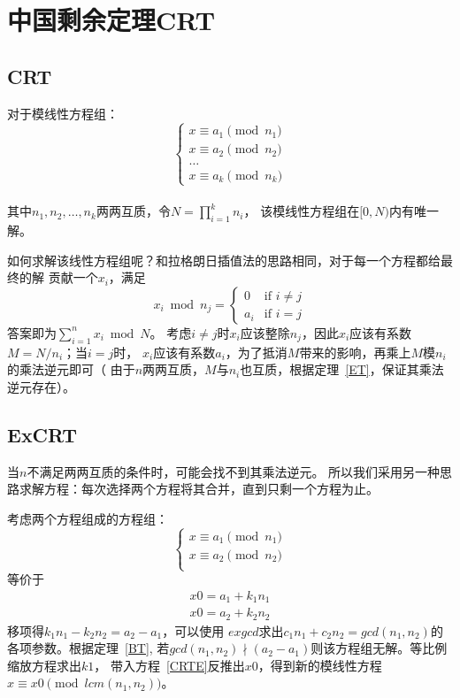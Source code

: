 \section{中国剩余定理CRT}
\subsection{CRT}
\begin{theorem}
	对于模线性方程组：
	\begin{displaymath}
		\left\{\begin{array}{l}
			x \equiv a_1 \pmod{n_1} \\
			x \equiv a_2 \pmod{n_2} \\
			\ldots                  \\
			x \equiv a_k \pmod{n_k}
		\end{array}\right.
	\end{displaymath}\\
	其中$n_1,n_2,\ldots,n_k$两两互质，令$\displaystyle N=\prod_{i=1}^k{n_i}$，
	该模线性方程组在$[0,N)$内有唯一解。
\end{theorem}
如何求解该线性方程组呢？和拉格朗日插值法的思路相同，对于每一个方程都给最终的解
贡献一个$x_i$，满足
\begin{displaymath}
	x_i \bmod n_j =
	\left\{\begin{array}{ll}
		0   & \textrm{if $i\neq j$} \\
		a_i & \textrm{if $i=j$}
	\end{array}\right.
\end{displaymath}
答案即为$\displaystyle \sum_{i=1}^n{x_i} \bmod N$。
考虑$i\neq j$时$x_i$应该整除$n_j$，因此$x_i$应该有系数$M=N/n_i$；当$i=j$时，
$x_i$应该有系数$a_i$，为了抵消$M$带来的影响，再乘上$M$模$n_i$的乘法逆元即可（
由于$n$两两互质，$M$与$n_i$也互质，根据定理~\ref{ET}，保证其乘法逆元存在）。
\subsection{ExCRT}
当$n$不满足两两互质的条件时，可能会找不到其乘法逆元。
所以我们采用另一种思路求解方程：每次选择两个方程将其合并，直到只剩一个方程为止。

考虑两个方程组成的方程组：
\begin{displaymath}
	\left\{\begin{array}{l}
		x \equiv a_1 \pmod{n_1} \\
		x \equiv a_2 \pmod{n_2} \\
	\end{array}\right.
\end{displaymath}
等价于
\begin{eqnarray}
	x0=a_1+k_1n_1\label{CRTE}\\
	x0=a_2+k_2n_2
\end{eqnarray}
移项得$k_1n_1-k_2n_2=a_2-a_1$，可以使用
$exgcd$求出$c_1n_1+c_2n_2=gcd(n_1,n_2)$的各项参数。根据定理~\ref{BT},
若$gcd(n_1,n_2)\nmid(a_2-a_1)$则该方程组无解。等比例缩放方程求出$k1$，
带入方程~\ref{CRTE}反推出$x0$，得到新的模线性方程$x \equiv x0
	\pmod{lcm(n_1,n_2)}$。

